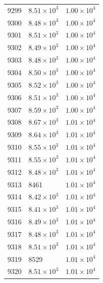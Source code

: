 \begin{table}[H]
\begin{tabular}{lll}
9299 & $\displaystyle 8.51 \times 10^{3}$ & $\displaystyle 1.00 \times 10^{4}$ \\
9300 & $\displaystyle 8.48 \times 10^{3}$ & $\displaystyle 1.00 \times 10^{4}$ \\
9301 & $\displaystyle 8.51 \times 10^{3}$ & $\displaystyle 1.00 \times 10^{4}$ \\
9302 & $\displaystyle 8.49 \times 10^{3}$ & $\displaystyle 1.00 \times 10^{4}$ \\
9303 & $\displaystyle 8.48 \times 10^{3}$ & $\displaystyle 1.00 \times 10^{4}$ \\
9304 & $\displaystyle 8.50 \times 10^{3}$ & $\displaystyle 1.00 \times 10^{4}$ \\
9305 & $\displaystyle 8.52 \times 10^{3}$ & $\displaystyle 1.00 \times 10^{4}$ \\
9306 & $\displaystyle 8.51 \times 10^{3}$ & $\displaystyle 1.00 \times 10^{4}$ \\
9307 & $\displaystyle 8.59 \times 10^{3}$ & $\displaystyle 1.00 \times 10^{4}$ \\
9308 & $\displaystyle 8.67 \times 10^{3}$ & $\displaystyle 1.01 \times 10^{4}$ \\
9309 & $\displaystyle 8.64 \times 10^{3}$ & $\displaystyle 1.01 \times 10^{4}$ \\
9310 & $\displaystyle 8.55 \times 10^{3}$ & $\displaystyle 1.01 \times 10^{4}$ \\
9311 & $\displaystyle 8.55 \times 10^{3}$ & $\displaystyle 1.01 \times 10^{4}$ \\
9312 & $\displaystyle 8.48 \times 10^{3}$ & $\displaystyle 1.01 \times 10^{4}$ \\
9313 & 8461 & $\displaystyle 1.01 \times 10^{4}$ \\
9314 & $\displaystyle 8.42 \times 10^{3}$ & $\displaystyle 1.01 \times 10^{4}$ \\
9315 & $\displaystyle 8.41 \times 10^{3}$ & $\displaystyle 1.01 \times 10^{4}$ \\
9316 & $\displaystyle 8.49 \times 10^{3}$ & $\displaystyle 1.01 \times 10^{4}$ \\
9317 & $\displaystyle 8.48 \times 10^{3}$ & $\displaystyle 1.01 \times 10^{4}$ \\
9318 & $\displaystyle 8.51 \times 10^{3}$ & $\displaystyle 1.01 \times 10^{4}$ \\
9319 & 8529 & $\displaystyle 1.01 \times 10^{4}$ \\
9320 & $\displaystyle 8.51 \times 10^{3}$ & $\displaystyle 1.01 \times 10^{4}$ \\

\end{tabular}
\end{table}

